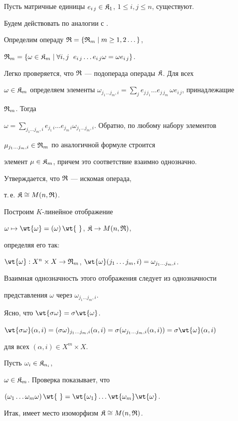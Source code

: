 \begin{pf}


Пусть матричные единицы $e_{i\,j}\in \frak K_1$, $1\le i,j\le n$, существуют.


Будем действовать по аналогии с \cite{Jac}.


Определим операду $\frak R=\{\frak R_m\mid m\ge 1,2\dots \}$,


$\frak R_m=\{\omega\in\frak K_m\mid \forall i,j\ \;


e_{i\,j}\dotsc e_{i\,j}\omega=\omega e_{i\,j}\}$.





Легко проверяется, что $\frak R$ --- подоперада операды $\frak K$. Для всех


$\omega\in \frak K_m$ определяем элементы $\omega_{j_1\dotsc j_m,i}=


\sum\limits_{j} e_{j\,j_1}\dotsc e_{j\,j_m}\,\omega e_{i\,j}$, принадлежащие


$\frak R_m$. Тогда


$\omega=\sum\limits_{j_1\dotsc j_m,i} e_{j_1\,i}\dotsc e_{j_m\,i}


\omega_{j_1\dotsc j_m,i}$. Обратно, по любому набору элементов


$\mu_{j_1\dotsc j_m,i}\in \frak R_m$ по аналогичной формуле строится


элемент $\mu\in \frak K_m$, причем это соответствие взаимно однозначно.


Утверждается, что $\frak R$ --- искомая операда,


т.\,е. $\frak K\cong M(n,\frak R)$.


Построим $K$-линейное отображение


$\omega\mapsto \wt{\omega}=(\omega)\,\wt{\ }$, $\frak K\to M(n,\frak R)$,


определяя его так:


$\wt{\omega}:X^n\times X\to \frak R_m$, $\wt{\omega}(j_1\dotsc j_m,i)=


\omega_{j_1\dotsc j_m,i}$.


Взаимная однозначность этого отображения следует из однозначности


представления $\omega$ через $\omega_{j_1\dotsc j_m,i}$.


Ясно, что $\wt{\sigma\omega}=\sigma\wt{\omega}$.\;


$\wt{\sigma\omega}(\alpha,i)=(\sigma\omega)_{j_1\dotsc j_m,i}(\alpha,i)=


\sigma(\omega_{j_1\dotsc j_m,i}(\alpha,i))=\sigma\wt{\omega}(\alpha,i)$


для всех $(\alpha,i)\in X^m\times X$.


Пусть $\omega_i\in \frak K_{n_i}$,


$\omega\in \frak K_m$. Проверка показывает, что


$(\omega_1\dotsc \omega_m\omega)\,\wt{\ }=


\wt{\omega_1}\dotsc \wt{\omega_m}\wt{\omega}$.


Итак, имеет место изоморфизм $\frak K\cong M(n,\frak R)$.


\end{pf}





